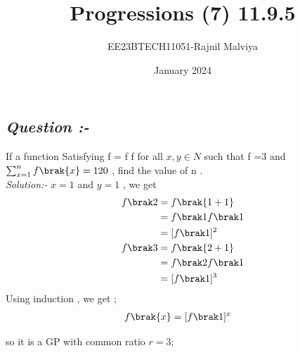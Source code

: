 \documentclass[journal,12pt,twocolumn]{IEEEtran}
\theoremstyle{remark}
\begin{document}
\title{Progressions (7) 11.9.5}
\author{EE23BTECH11051-Rajnil Malviya}
\date{January 2024}
\maketitle
\subsection*{\textit{Question :-}}
If a function Satisfying f = f f for all $x,y \in {N}$ such that f =3 and $\sum_{x=1}^{n} f\brak{x} = 120$ , find the value of n .\\
\textit{Solution:- }
  $x=1$ and $y=1$ , we get
\begin{align}
    f\brak2&=f\brak{1+1}\\
     &={f\brak1} f\brak 1\\
     &=[f\brak 1]^2\\
      f\brak3&=f\brak{2+1} \\
  &    ={f\brak2} f\brak 1\\
 &= [f\brak 1]^3
        \end{align}
        Using induction , we get ;
       \begin{align}
            f\brak{x }&=[f\brak 1]^x
       \end{align}
       


so it is a GP with common ratio $r=3 ;$


\begin{table}[h!]
            
    \end{table}
\end{document}

